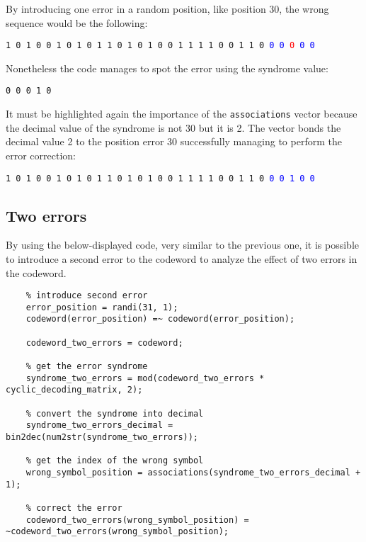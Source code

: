 \noindent By introducing one error in a random position, like position 30, the wrong sequence would be the following:

\begin{center}
    \texttt{1 0 1 0 0 1 0 1 0 1 1 0 1 0 1 0 0 1 1 1 1 0 0 1 1 0 }\textcolor{blue}{\texttt{0 0 }}\textcolor{red}{\texttt{0 }}\textcolor{blue}{\texttt{0 0}}
\end{center}

\noindent Nonetheless the code manages to spot the error using the syndrome value:

\begin{center}
    \texttt{0 0 0 1 0}
\end{center}

\noindent It must be highlighted again the importance of the \texttt{associations} vector because the decimal value of the syndrome is not 30 but it is 2. The vector bonds the decimal value 2 to the position error 30 successfully managing to perform the error correction:
\begin{center}
    \texttt{1 0 1 0 0 1 0 1 0 1 1 0 1 0 1 0 0 1 1 1 1 0 0 1 1 0 }\textcolor{blue}{\texttt{0 0 1 0 0}}
\end{center}


\subsection{Two errors} \label{two-errors-correction}
By using the below-displayed code, very similar to the previous one, it is possible to introduce a second error to the codeword to analyze the effect of two errors in the codeword. 

\begin{lstlisting}
    % introduce second error
    error_position = randi(31, 1);
    codeword(error_position) =~ codeword(error_position);

    codeword_two_errors = codeword;

    % get the error syndrome
    syndrome_two_errors = mod(codeword_two_errors * cyclic_decoding_matrix, 2);

    % convert the syndrome into decimal
    syndrome_two_errors_decimal = bin2dec(num2str(syndrome_two_errors));

    % get the index of the wrong symbol
    wrong_symbol_position = associations(syndrome_two_errors_decimal + 1);

    % correct the error
    codeword_two_errors(wrong_symbol_position) = ~codeword_two_errors(wrong_symbol_position);
\end{lstlisting}

